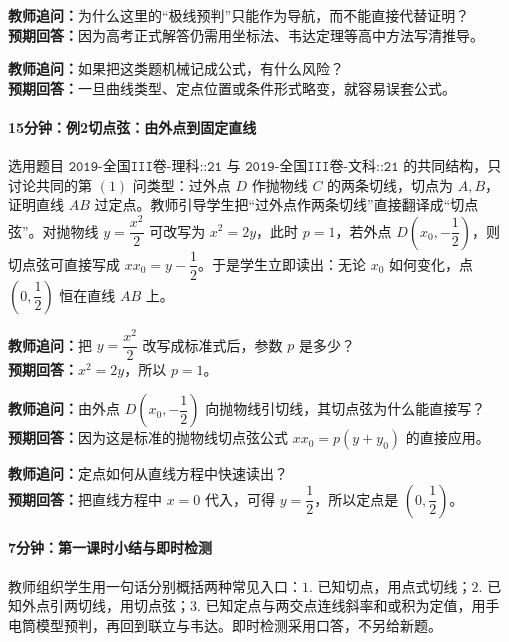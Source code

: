 \documentclass[UTF8,a4paper,11pt]{ctexart}
\begin{document}
\noindent\textbf{教师追问：}为什么这里的“极线预判”只能作为导航，而不能直接代替证明？\\

\textbf{预期回答：}因为高考正式解答仍需用坐标法、韦达定理等高中方法写清推导。\par

\noindent\textbf{教师追问：}如果把这类题机械记成公式，有什么风险？\\

\textbf{预期回答：}一旦曲线类型、定点位置或条件形式略变，就容易误套公式。\par

\paragraph{15分钟：例2切点弦：由外点到固定直线}

选用题目 $\texttt{2019-全国III卷-理科::21}$ 与 $\texttt{2019-全国III卷-文科::21}$ 的共同结构，只讨论共同的第 $(1)$ 问类型：过外点 $D$ 作抛物线 $C$ 的两条切线，切点为 $A,B$，证明直线 $AB$ 过定点。教师引导学生把“过外点作两条切线”直接翻译成“切点弦”。对抛物线 $y=\dfrac{x^2}{2}$ 可改写为 $x^2=2y$，此时 $p=1$，若外点 $D(x_0,-\dfrac12)$，则切点弦可直接写成 $xx_0=y-\dfrac12$。于是学生立即读出：无论 $x_0$ 如何变化，点 $\left(0,\dfrac12\right)$ 恒在直线 $AB$ 上。

\noindent\textbf{教师追问：}把 $y=\dfrac{x^2}{2}$ 改写成标准式后，参数 $p$ 是多少？\\

\textbf{预期回答：}$x^2=2y$，所以 $p=1$。\par

\noindent\textbf{教师追问：}由外点 $D(x_0,-\dfrac12)$ 向抛物线引切线，其切点弦为什么能直接写？\\

\textbf{预期回答：}因为这是标准的抛物线切点弦公式 $xx_0=p(y+y_0)$ 的直接应用。\par

\noindent\textbf{教师追问：}定点如何从直线方程中快速读出？\\

\textbf{预期回答：}把直线方程中 $x=0$ 代入，可得 $y=\dfrac12$，所以定点是 $\left(0,\dfrac12\right)$。\par

\paragraph{7分钟：第一课时小结与即时检测}

教师组织学生用一句话分别概括两种常见入口：$1.$ 已知切点，用点式切线；$2.$ 已知外点引两切线，用切点弦；$3.$ 已知定点与两交点连线斜率和或积为定值，用手电筒模型预判，再回到联立与韦达。即时检测采用口答，不另给新题。
\end{document}
